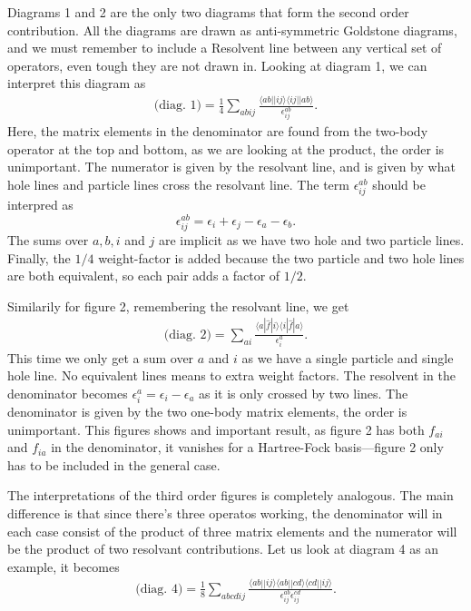 \documentclass[a4paper, 11pt, notitlepage, english]{article}
\newcommand{\brakket}[2]{\langle #1 || #2 \rangle}
\newcommand{\op}[1]{\hat{#1}}
\newcommand{\braopket}[3]{\langle #1 | {#2} | #3 \rangle}
\newcommand{\eps}{\epsilon}
\begin{document}
Diagrams 1 and 2 are the only two diagrams that form the second order contribution. All the diagrams are drawn as anti-symmetric Goldstone diagrams, and we must remember to include a Resolvent line between any vertical set of operators, even tough they are not drawn in. Looking at diagram 1, we can interpret this diagram as
\begin{align*}
  \mbox{(diag.\ 1)} = \frac{1}{4}\sum_{abij}\frac{\brakket{ab}{ij}\brakket{ij}{ab}}{\eps_{ij}^{ab}}.
\end{align*}
Here, the matrix elements in the denominator are found from the two-body operator at the top and bottom, as we are looking at the product, the order is unimportant. The numerator is given by the resolvant line, and is given by what hole lines and particle lines cross the resolvant line. The term $\eps_{ij}^{ab}$ should be interpred as
$$\eps_{ij}^{ab} = \eps_i + \eps_j - \eps_a - \eps_b.$$
The sums over $a,b,i$ and $j$ are implicit as we have two hole and two particle lines. Finally, the $1/4$ weight-factor is added because the two particle and two hole lines are both equivalent, so each pair adds a factor of $1/2$.

Similarily for figure 2, remembering the resolvant line, we get
\begin{align*}
  \mbox{(diag.\ 2)} = \sum_{ai}\frac{\braopket{a}{\op{f}}{i}\braopket{i}{\op{f}}{a}}{\eps_{i}^a}.
\end{align*}
This time we only get a sum over $a$ and $i$ as we have a single particle and single hole line. No equivalent lines means to extra weight factors. The resolvent in the denominator becomes $\eps_i^a = \eps_i - \eps_a$ as it is only crossed by two lines. The denominator is given by the two one-body matrix elements, the order is unimportant. This figures shows and important result, as figure 2 has both $f_{ai}$ and $f_{ia}$ in the denominator, it vanishes for a Hartree-Fock basis---figure 2 only has to be included in the general case.

The interpretations of the third order figures is completely analogous. The main difference is that since there's three operatos working, the denominator will in each case consist of the product of three matrix elements and the numerator will be the product of two resolvant contributions. Let us look at diagram 4 as an example, it becomes
\begin{align*}
  \mbox{(diag.\ 4)} = \frac{1}{8}\sum_{abcdij}\frac{\brakket{ab}{ij}\brakket{ab}{cd}\brakket{cd}{ij}}{\eps_{ij}^{ab}\eps_{ij}^{cd}}.
\end{align*}
\end{document}
